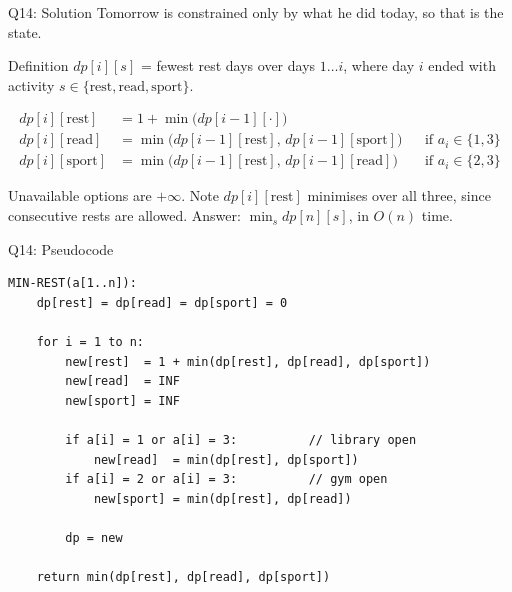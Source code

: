 \documentclass[10pt,aspectratio=169]{beamer}
\begin{document}
\begin{frame}{Q14: Solution}
  Tomorrow is constrained only by \alert{what he did today}, so that is the state.

  \begin{block}{Definition}
    $dp[i][s]$ = fewest rest days over days $1 \ldots i$, where day $i$ ended
    with activity $s \in \{\text{rest}, \text{read}, \text{sport}\}$.
  \end{block}

  \bigskip
  \begin{align*}
    dp[i][\text{rest}]  &= 1 + \min\big( dp[i-1][\cdot] \big) \\
    dp[i][\text{read}]  &= \min\big( dp[i-1][\text{rest}],\, dp[i-1][\text{sport}] \big)
                           && \text{if } a_i \in \{1,3\} \\
    dp[i][\text{sport}] &= \min\big( dp[i-1][\text{rest}],\, dp[i-1][\text{read}] \big)
                           && \text{if } a_i \in \{2,3\}
  \end{align*}

  \bigskip
  Unavailable options are $+\infty$. Note $dp[i][\text{rest}]$ minimises over
  \alert{all three}, since consecutive rests are allowed.
  Answer: $\min_s dp[n][s]$, in $O(n)$ time.
\end{frame}

\begin{frame}[fragile]{Q14: Pseudocode}
  \begin{lstlisting}[style=pc]
MIN-REST(a[1..n]):
    dp[rest] = dp[read] = dp[sport] = 0

    for i = 1 to n:
        new[rest]  = 1 + min(dp[rest], dp[read], dp[sport])
        new[read]  = INF
        new[sport] = INF

        if a[i] = 1 or a[i] = 3:          // library open
            new[read]  = min(dp[rest], dp[sport])
        if a[i] = 2 or a[i] = 3:          // gym open
            new[sport] = min(dp[rest], dp[read])

        dp = new

    return min(dp[rest], dp[read], dp[sport])
  \end{lstlisting}
\end{frame}


\end{document}
